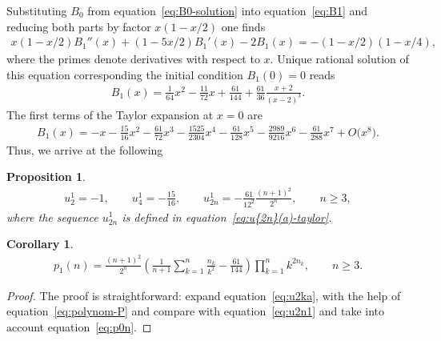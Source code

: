 \documentclass[pdftex]{sigma}
\numberwithin{equation}{section}
\newtheorem{Corollary}[Theorem]{Corollary}
\newtheorem{Proposition}[Theorem]{Proposition}
 { \theoremstyle{definition}
\newtheorem{Remark}[Theorem]{Remark} }
\begin{document}
Substituting $B_0$ from equation~\eqref{eq:B0-solution} into equation~\eqref{eq:B1} and reducing both parts by factor $x(1-x/2)$ one finds
\begin{gather*}
x(1-x/2)B_1''(x)+ (1-5x/2 )B_1'(x)-2B_1(x)=-(1-x/2)(1-x/4),
\end{gather*}
where the primes denote derivatives with respect to $x$. Unique rational solution of this equation corresponding the initial condition $B_1(0)=0$ reads
\begin{gather}\label{eq:B1x}
B_1(x)=\frac{1}{64}x^2-\frac{11}{72}x+\frac{61}{144}+\frac{61}{36} \frac{x+2}{(x-2)^3}.
\end{gather}
The first terms of the Taylor expansion at $x=0$ are
\begin{gather*}
B_1(x)=-x-\frac{15}{16}x^2-\frac{61}{72}x^3-\frac{1525}{2304}x^4-\frac{61}{128}x^5-\frac{2989}{9216}x^6-\frac{61}{288}x^7+O\big(x^8\big).
\end{gather*}
Thus, we arrive at the following
\begin{Proposition}\label{prop:u2n1}
\begin{gather}\label{eq:u2n1}
u_2^1=-1,\qquad
u_4^1=-\frac{15}{16},\qquad
u_{2n}^1=-\frac{61}{12^2}\frac{(n+1)^2}{2^n}, \qquad n\geq3,
\end{gather}
where the sequence $u_{2n}^1$ is defined in equation~\eqref{eq:u{2n}(a)-taylor}.
\end{Proposition}
\begin{Corollary}\label{cor:p1n}
\begin{gather}\label{eq:p1n}
p_1(n)=\frac{(n+1)^2}{2^n}\left(\frac{1}{n+1}\sum\limits_{k=1}^n\frac{n_k}{k^2}-\frac{61}{144}\right)
\prod\limits_{k=1}^{n}k^{2n_k},\qquad n\geq3.
\end{gather}
\end{Corollary}
\begin{proof}
The proof is straightforward: expand equation~\eqref{eq:u2ka}, with the help of equation~\eqref{eq:polynom-P} and
compare with equation~\eqref{eq:u2n1} and take into account equation~\eqref{eq:p0n}.
\end{proof}
\end{document}
